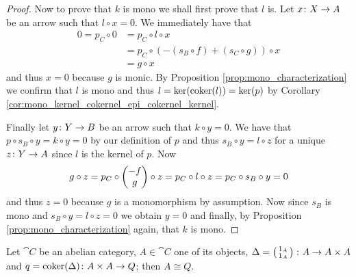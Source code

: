 \begin{proof}
  Now to prove that \(k\) is mono we shall first prove that \(l\) is. Let \(x\colon X\to A\) be an arrow such that \(l\circ x = 0\). We immediately have that
  \begin{align*}
    0 = p_C\circ 0 &= p_C\circ l\circ x\\
                   &= p_C\circ(-(s_B\circ f) + (s_C\circ g))\circ x\\
                   &= g\circ x
  \end{align*}
  and thus \(x = 0\) because \(g\) is monic. By Proposition \ref{prop:mono_characterization} we confirm that \(l\) is mono and thus \(l = \ker(\operatorname{coker}(l)) = \ker(p)\) by Corollary \ref{cor:mono_kernel_cokernel_epi_cokernel_kernel}.

  Finally let \(y\colon Y\to B\) be an arrow such that \(k\circ y = 0\). We have that \(p\circ s_B\circ y = k\circ y = 0\) by our definition of \(p\) and thus \(s_B\circ y = l\circ z\) for a unique \(z\colon Y\to A\) since \(l\) is the kernel of \(p\). Now
  \begin{equation*}
    g\circ z = p_C\circ\begin{pmatrix}-f\\ g\end{pmatrix}\circ z = p_C\circ l\circ z = p_C\circ s_B\circ y = 0
  \end{equation*}
  and thus \(z = 0\) because \(g\) is a monomorphism by assumption. Now since \(s_B\) is mono and \(s_B\circ y = l\circ z = 0\) we obtain \(y = 0\) and finally, by Proposition \ref{prop:mono_characterization} again, that \(k\) is mono.
\end{proof}

\begin{lemma}
  \label{lemma:difference_lemma}
  Let \(\cat{C}\) be an abelian category, \(A\in\cat{C}\) one of its objects, \(\Delta = \left(\begin{smallmatrix}1_A\\ 1_A\end{smallmatrix}\right)\colon A\to A\times A\) and \(q = \operatorname{coker}(\Delta)\colon A\times A\to Q\); then \(A\cong Q\).
\end{lemma}

\begin{figure}[h]
  
  \caption{}
  \label{diagram:lemma1}
\end{figure}

